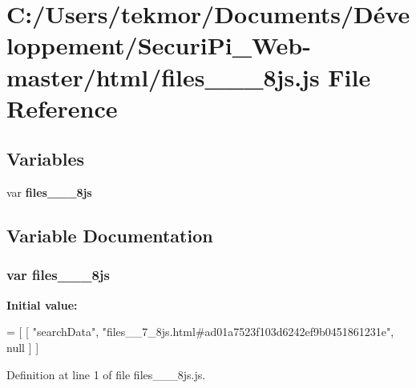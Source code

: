 \section{C\+:/\+Users/tekmor/\+Documents/\+Développement/\+Securi\+Pi\+\_\+\+Web-\/master/html/files\+\_\+\+\_\+\_\+8js.js File Reference}
\label{files____7__8js_8js}
\subsection*{Variables}
\begin{DoxyCompactItemize}
\item 
var {\bf files\+\_\+\+\_\+\_\+8js}
\end{DoxyCompactItemize}


\subsection{Variable Documentation}
\subsubsection[{files\+\_\+\+\_\+7\+\_\+8js}]{\setlength{\rightskip}{0pt plus 5cm}var files\+\_\+\+\_\+\_\+8js}\label{files____7__8js_8js_a075c92f6d29d37eb59483029aa48aa4c}
{\bfseries Initial value\+:}
\begin{DoxyCode}
=
[
    [ \textcolor{stringliteral}{"searchData"}, \textcolor{stringliteral}{"files\_\_7\_8js.html#ad01a7523f103d6242ef9b0451861231e"}, null ]
]
\end{DoxyCode}


Definition at line 1 of file files\+\_\+\+\_\+\_\+8js.\+js.

